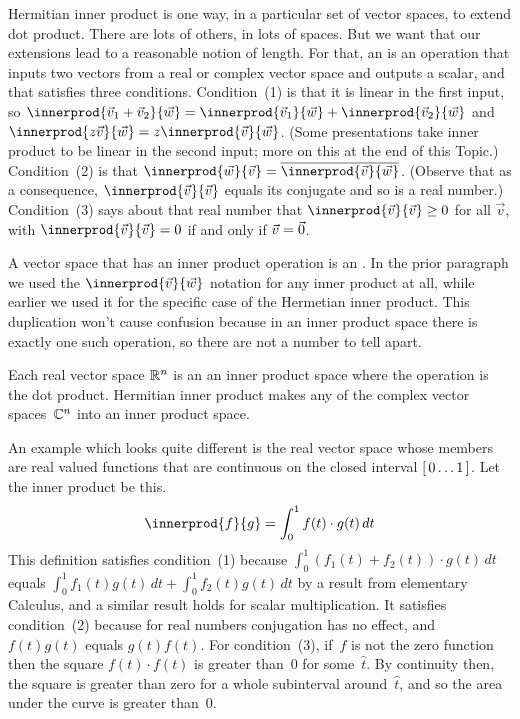 Hermitian inner product is one way, in a particular set of vector spaces, 
to extend dot product.
There are lots of others, in lots of spaces.
But we want that our extensions lead to a reasonable notion of length.
For that,
an  is an operation
that inputs two vectors from a real or complex vector space 
and outputs a scalar, and that
satisfies three conditions.
Condition~(1) is that it is linear in the first input, so
$\innerprod{\vec{v}_1+\vec{v}_2}{\vec{w}}
 = \innerprod{\vec{v}_1}{\vec{w}}
   +\innerprod{\vec{v}_2}{\vec{w}}$
and $\innerprod{z\vec{v}}{\vec{w}}
     =z\innerprod{\vec{v}}{\vec{w}}$.
(Some presentations take inner product 
to be linear in the second input; more on this
at the end of this Topic.)
Condition~(2) is that
$\innerprod{\vec{w}}{\vec{v}}=\compconj{\innerprod{\vec{v}}{\vec{w}}}$.
(Observe that as a consequence, 
$\innerprod{\vec{v}}{\vec{v}}$ equals its conjugate and
so is a real number.)
Condition~(3) says about that real number that
$\innerprod{\vec{v}}{\vec{v}}\geq 0$ for all $\vec{v}$, with 
$\innerprod{\vec{v}}{\vec{v}}= 0$ if and only if $\vec{v}=\vec{0}$.

A vector space that has an inner product operation is an
.
In the prior paragraph we used the $\innerprod{\vec{v}}{\vec{w}}$ notation 
for any inner product at all, while earlier we used it for the specific case of
the Hermetian inner product.
This duplication won't cause confusion because in an inner product space there
is exactly one such operation, so there are not a number to tell apart.

Each real vector space $\mathbb{R}^n$ is an an inner product space
where the operation is the dot product. 
Hermitian inner product makes any of the complex vector spaces~$\mathbb{C}^n$ into 
an inner product space.

An example which looks quite different 
is the real vector space whose members are
real valued functions that are continuous on the 
closed interval $[\,0\ldots 1\,]$.
Let the inner product be this.
\begin{equation*}
  \innerprod{f}{g}=\int_{0}^1 f(t)\cdot g(t)\,dt
\end{equation*}
This definition satisfies
condition~(1) because  
$\int_{0}^1 (f_1(t)+f_2(t))\cdot g(t)\,dt$ equals 
$\int_{0}^1 f_1(t)g(t)\,dt+\int_{0}^1 f_2(t)g(t)\,dt$
by a result from elementary Calculus,
and a similar result holds for scalar multiplication. 
It satisfies condition~(2) because for real numbers conjugation has no effect,
and $f(t)g(t)$ equals $g(t)f(t)$. 
For condition~(3), if~$f$ is not the zero function then 
the square $f(t)\cdot f(t)$ is greater than~$0$ for some~$\hat{t}$.
By continuity then, the square is greater than zero for a whole subinterval
around~$\hat{t}$,
and so the area under the curve is greater than~$0$.

